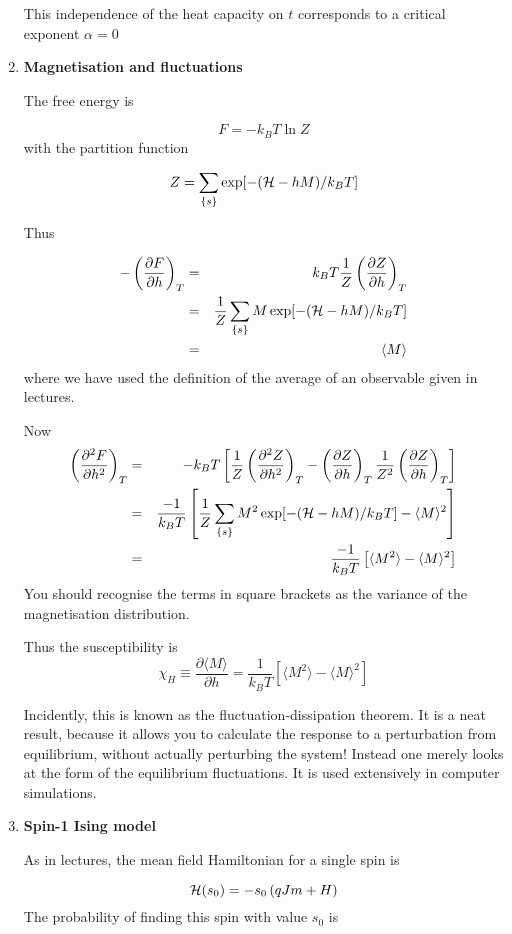 \documentclass[a4paper,12pt,twoside]{article}
\begin{document}
\begin{enumerate}
This independence of the heat capacity on $t$ corresponds to a critical
exponent $\alpha=0$

\item {\bf Magnetisation and fluctuations}

The free energy is 

\[
F=-k_BT\ln Z
\]
with the partition function 

\[
Z=\sum_{\{s\}}\exp[-({\cal H}-hM)/k_BT]
\]

Thus

\begin{eqnarray*}
-\left(\frac{\partial F}{\partial h}\right)_T &=& k_BT\frac{1}{Z}\left(\frac{\partial Z}{\partial h}\right)_T\\
\: &=&\frac{1}{Z}\sum_{\{s\}}M \exp[-({\cal H}-hM)/k_BT]\\
   &=& \langle M\rangle
\end{eqnarray*}
where we have used the definition of the average of an observable given
in lectures.

Now 
\begin{eqnarray*}
\left(\frac{\partial^2 F}{\partial h^2}\right)_T &=& -k_BT\left[\frac{1}{Z}\left(\frac{\partial^2 Z}{\partial h^2}\right)_T-\left(\frac{\partial Z}{\partial h}\right)_T\frac{1}{Z^2}\left(\frac{\partial Z}{\partial h}\right)_T\right]\\
\: &=&\frac{-1}{k_BT}\left[\frac{1}{Z}\sum_{\{s\}}M^2 \exp[-({\cal H}-hM)/k_BT]-\langle M\rangle^2\right]\\
\:   &=& \frac{-1}{k_BT}\left[\langle M^2\rangle-\langle M\rangle^2\right]
\end{eqnarray*}
You should recognise the terms in square brackets as the variance of the
magnetisation distribution.

Thus the susceptibility is 
\[
\chi_H\equiv\frac{\partial \langle M\rangle}{\partial h}=\frac{1}{k_BT}\left[\langle M^2\rangle-\langle M\rangle^2\right]
\]

Incidently, this is known as the fluctuation-dissipation theorem. It is
a neat result, because it allows you to calculate the response to a
perturbation from equilibrium, without actually perturbing the system!
Instead one merely looks at the form of the equilibrium fluctuations. It is used extensively in computer simulations.

\item {\bf Spin-1 Ising model}

As in lectures, the mean field Hamiltonian for a single spin is 

\[
{\cal H}(s_0)=-s_0\left(qJm + H\right)
\]
The probability of finding this spin with value $s_0$ is


\end{enumerate}
\end{document}
